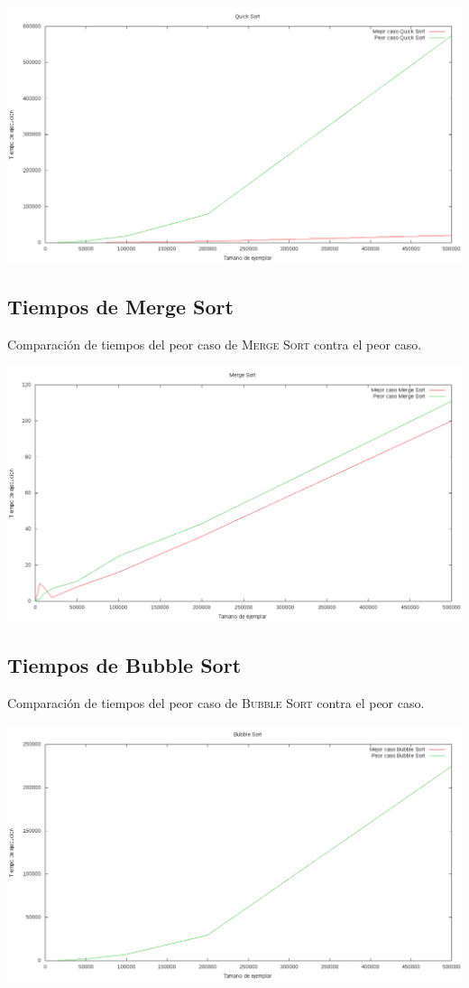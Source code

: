 \documentclass[spanish,12pt,letterpaper]{article}
\begin{document}
{
\includegraphics[scale=0.5]{quickSort}
\centering
}

\subsection{Tiempos de Merge Sort}

Comparación de tiempos del peor caso de \textsc{Merge Sort} contra el peor caso.

{
\includegraphics[scale=0.5]{mergeSort}
\centering
}

\subsection{Tiempos de Bubble Sort}

Comparación de tiempos del peor caso de \textsc{Bubble Sort} contra el peor caso.

{
\includegraphics[scale=0.5]{bubbleSort}
\centering
}
\end{document}
